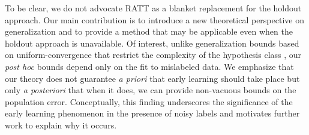




To be clear, we do not advocate RATT 
as a blanket replacement 
for the holdout approach.
Our main contribution is to introduce 
a new theoretical perspective on generalization
and to provide a method that may be applicable
even when the holdout approach is unavailable. 
Of interest, unlike generalization bounds
based on uniform-convergence 
that restrict the complexity 
of the hypothesis class
\citep{neyshabur2018role,neyshabur2015norm,neyshabur2017pac,bartlett2017spectrally,nagarajan2019deterministic}, 
our \emph{post hoc} bounds depend 
only on the fit to mislabeled data.
We emphasize that our theory 
does not guarantee \emph{a priori}
that early learning should take place
but only \emph{a posteriori} that when it does,
we can provide non-vacuous bounds 
on the population error.
Conceptually, this finding underscores 
the significance 
of the early learning phenomenon 
in the presence of noisy labels
and motivates further work 
to explain why it occurs. 




% 
% 


